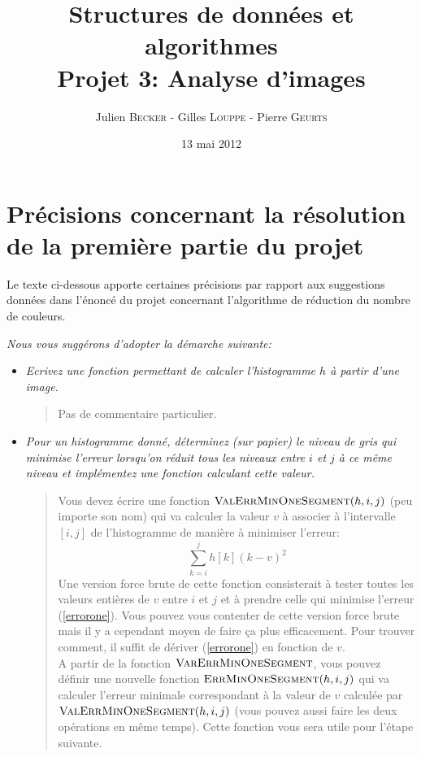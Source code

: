 \documentclass[a4paper,10pt]{article}
\title{
    \textbf{Structures de données et algorithmes}\\
    Projet 3: Analyse d'images
}
\author{Julien \textsc{Becker} - Gilles \textsc{Louppe} - Pierre \textsc{Geurts}}
\date{13 mai 2012}
\begin{document}
\maketitle

\section*{Précisions concernant la résolution de la première partie du projet}

Le texte ci-dessous apporte certaines précisions par rapport aux
suggestions données dans l'énoncé du projet concernant l'algorithme de
réduction du nombre de couleurs.

\bigskip

{\it Nous vous suggérons d'adopter la démarche suivante:}
\begin{itemize}
\item {\it Ecrivez une fonction permettant de calculer l'histogramme $h$ à
  partir d'une image.}

\bigskip

\begin{quote}
Pas de commentaire particulier.
\end{quote}

\bigskip

\item {\it Pour un histogramme donné, déterminez (sur papier) le niveau de
  gris qui minimise l'erreur lorsqu'on réduit tous les niveaux entre
  $i$ et $j$ à ce même niveau et implémentez une fonction calculant
  cette valeur.}

\bigskip

\begin{quote}
Vous devez écrire une fonction $\textnormal{\scshape ValErrMinOneSegment}(h,i,j)$ (peu importe son nom)
qui va calculer la valeur $v$ à associer à l'intervalle $[i,j]$ de
l'histogramme de manière à minimiser l'erreur:
\begin{equation}\label{errorone}
\sum_{k=i}^j h[k] (k-v)^2
\end{equation}
Une version force brute de cette fonction consisterait à tester toutes
les valeurs entières de $v$ entre $i$ et $j$ et à prendre celle qui
minimise l'erreur (\ref{errorone}). Vous pouvez vous contenter de
cette version force brute mais il y a cependant moyen de faire ça plus
efficacement. Pour trouver comment, il suffit de dériver
(\ref{errorone}) en fonction de $v$.\\ A partir de la fonction
$\textnormal{\scshape VarErrMinOneSegment}$, vous pouvez définir une nouvelle
fonction $\textnormal{\scshape ErrMinOneSegment}(h,i,j)$ qui va calculer l'erreur
minimale correspondant à la valeur de $v$ calculée par
$\textnormal{\scshape ValErrMinOneSegment}(h,i,j)$ (vous pouvez aussi faire les deux
opérations en même temps). Cette fonction vous sera utile pour l'étape suivante.
\end{quote}


\end{itemize}
\end{document}
